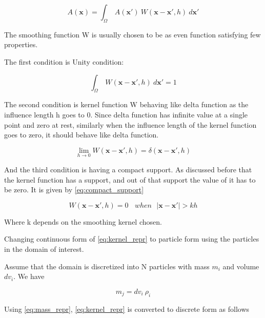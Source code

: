 \begin{equation}
  \label{eq:kernel_repr}
  A(\boldsymbol{x}) = \int_{\Omega}\> A(\boldsymbol{x}') \> W(\boldsymbol{x} - \boldsymbol{x}', h)  \> d\boldsymbol{x}'
\end{equation}

The smoothing function W is usually chosen to be as even function
satisfying few properties.

The first condition is Unity condition:

\begin{equation}
  \label{eq:unity}
  \int_{\Omega}\> W(\boldsymbol{x} - \boldsymbol{x}', h)  \> d\boldsymbol{x}' = 1
\end{equation}

The second condition is kernel function W behaving like delta function
as the influence length h goes to 0. Since delta function has infinite
value at a single point and zero at rest, similarly when the influence
length of the kernel function goes to zero, it should behave like
delta function.

\begin{equation}
  \label{eq:kernel_delta}
  \lim_{h \to 0} W(\boldsymbol{x} - \boldsymbol{x}', h) = \delta(\boldsymbol{x} - \boldsymbol{x}', h)
\end{equation}

And the third condition is having a compact support. As discussed before
that the kernel function has a support, and out of that support the value of
it has to be zero. It is given by \eqref{eq:compact_support}

\begin{equation}
  \label{eq:compact_support}
  W(\boldsymbol{x} - \boldsymbol{x}', h) = 0 \>\>\>\>    when  \>\>\> |\boldsymbol{x} - \boldsymbol{x}'| > kh
\end{equation}

Where k depends on the smoothing kernel chosen.

Changing continuous form of \eqref{eq:kernel_repr} to particle form using
the particles in the domain of interest.

Assume that the domain is discretized into N particles with mass $m_i$ and volume
$dv_i$. We have

\begin{equation}
  \label{eq:mass_repr}
  m_j = dv_i \> \rho_i
\end{equation}

Using \eqref{eq:mass_repr}, \eqref{eq:kernel_repr} is converted to
discrete form as follows

